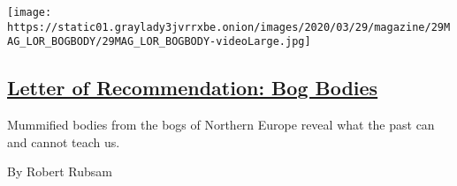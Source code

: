 \begin{enumerate}
  \texttt{[image: https://static01.graylady3jvrrxbe.onion/images/2020/03/29/magazine/29MAG\_LOR\_BOGBODY/29MAG\_LOR\_BOGBODY-videoLarge.jpg]}

  \hypertarget{letter-of-recommendation-bog-bodies}{%
  \subsection{\texorpdfstring{\href{/2020/03/24/magazine/letter-of-recommendation-bog-bodies.html}{Letter
  of Recommendation: Bog
  Bodies}}{Letter of Recommendation: Bog Bodies}}\label{letter-of-recommendation-bog-bodies}}

  Mummified bodies from the bogs of Northern Europe reveal what the past
  can and cannot teach us.

  By Robert Rubsam
\end{enumerate}

